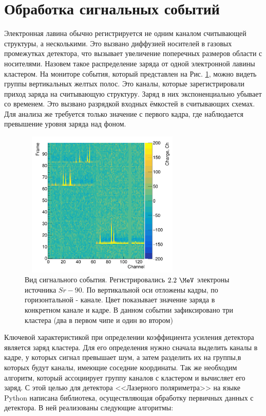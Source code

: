 \section{Обработка сигнальных событий}\label{sec:event_analysis}
Электронная лавина обычно регистрируется не одним каналом считывающей структуры, а несколькими. Это вызвано диффузией носителей в газовых промежутках детектора, что вызывает увеличение поперечных размеров области с носителями. Назовем такое распределение заряда от одной электронной лавины кластером. На мониторе события, который представлен на Рис. \ref{event_map}, можно видеть группы вертикальных желтых полос. Это каналы, которые зарегистрировали приход заряда на считывающую структуру. Заряд в них экспоненциально убывает со временем. Это вызвано разрядкой входных ёмкостей в считывающих схемах. Для анализа же требуется только значение с первого кадра, где наблюдается превышение уровня заряда над фоном.   
\begin{figure}[H]
	\begin{center}
		\includegraphics[width = 8cm, height = 7cm]{img/Signal.png}
		\caption{Вид сигнального события. Регистрировались $2.2~\MeV$ электроны источника $Sr-90$. По вертикальной оси отложены кадры, по горизонтальной - канале. Цвет показывает значение заряда в конкретном канале и кадре. В данном событии зафиксировано три кластера (два в первом чипе и один во втором)}
		\label{event_map}
	\end{center}
\end{figure}%
Ключевой характеристикой при определении коэффициента усиления детектора является заряд кластера. Для его определения нужно сначала выделить каналы в кадре, у которых сигнал превышает шум, а затем разделить их на группы,в которых будут каналы, имеющие соседние координаты. Так же необходим алгоритм, который ассоциирует группу каналов с кластером и вычисляет его заряд. С этой целью для детектора <<Лазерного поляриметра>> на языке Python написана библиотека, осуществляющая обработку первичных данных с детектора. В ней реализованы следующие алгоритмы:

